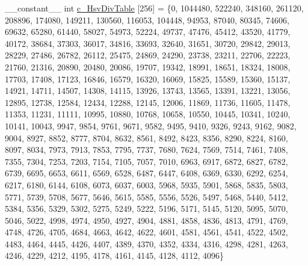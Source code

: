 \begin{DoxyCompactItemize}
\-\_\-\-\_\-constant\-\_\-\-\_\- int \hyperlink{namespacecv_1_1gpu_1_1device_1_1color__detail_a4b72f07cdf038e68528bcf73c1eb53f9}{c\-\_\-\-Hsv\-Div\-Table} \mbox{[}256\mbox{]} = \{0, 1044480, 522240, 348160, 261120, 208896, 174080, 149211, 130560, 116053, 104448, 94953, 87040, 80345, 74606, 69632, 65280, 61440, 58027, 54973, 52224, 49737, 47476, 45412, 43520, 41779, 40172, 38684, 37303, 36017, 34816, 33693, 32640, 31651, 30720, 29842, 29013, 28229, 27486, 26782, 26112, 25475, 24869, 24290, 23738, 23211, 22706, 22223, 21760, 21316, 20890, 20480, 20086, 19707, 19342, 18991, 18651, 18324, 18008, 17703, 17408, 17123, 16846, 16579, 16320, 16069, 15825, 15589, 15360, 15137, 14921, 14711, 14507, 14308, 14115, 13926, 13743, 13565, 13391, 13221, 13056, 12895, 12738, 12584, 12434, 12288, 12145, 12006, 11869, 11736, 11605, 11478, 11353, 11231, 11111, 10995, 10880, 10768, 10658, 10550, 10445, 10341, 10240, 10141, 10043, 9947, 9854, 9761, 9671, 9582, 9495, 9410, 9326, 9243, 9162, 9082, 9004, 8927, 8852, 8777, 8704, 8632, 8561, 8492, 8423, 8356, 8290, 8224, 8160, 8097, 8034, 7973, 7913, 7853, 7795, 7737, 7680, 7624, 7569, 7514, 7461, 7408, 7355, 7304, 7253, 7203, 7154, 7105, 7057, 7010, 6963, 6917, 6872, 6827, 6782, 6739, 6695, 6653, 6611, 6569, 6528, 6487, 6447, 6408, 6369, 6330, 6292, 6254, 6217, 6180, 6144, 6108, 6073, 6037, 6003, 5968, 5935, 5901, 5868, 5835, 5803, 5771, 5739, 5708, 5677, 5646, 5615, 5585, 5556, 5526, 5497, 5468, 5440, 5412, 5384, 5356, 5329, 5302, 5275, 5249, 5222, 5196, 5171, 5145, 5120, 5095, 5070, 5046, 5022, 4998, 4974, 4950, 4927, 4904, 4881, 4858, 4836, 4813, 4791, 4769, 4748, 4726, 4705, 4684, 4663, 4642, 4622, 4601, 4581, 4561, 4541, 4522, 4502, 4483, 4464, 4445, 4426, 4407, 4389, 4370, 4352, 4334, 4316, 4298, 4281, 4263, 4246, 4229, 4212, 4195, 4178, 4161, 4145, 4128, 4112, 4096\}
\item 

\end{DoxyCompactItemize}
